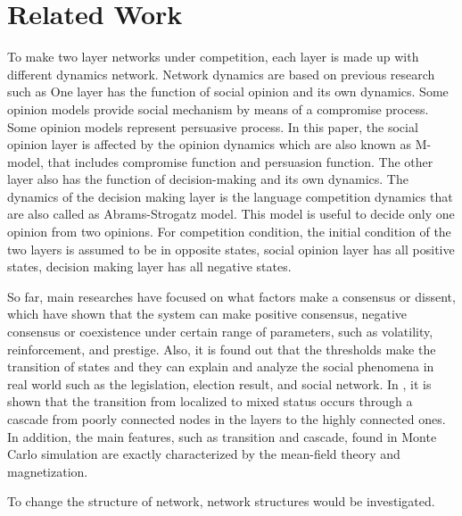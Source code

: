 \section{Related Work}
To make two layer networks under competition, each layer is made up with different dynamics network. Network dynamics are based on previous research such as \cite{alvarez2016} One layer has the function of social opinion and its own dynamics. Some opinion models provide social mechanism by means of a compromise process.\cite{naim2003} Some opinion models represent persuasive process.\cite{chau2014} In this paper, the social opinion layer is affected by the opinion dynamics which are also known as M-model\cite{rocca2014}, that includes compromise function and persuasion function. The other layer also has the function of decision-making and its own dynamics. The dynamics of the decision making layer is the language competition dynamics that are also called as Abrams-Strogatz model\cite{abrams2003, vazquez2010, patriarca2012}. This model is useful to decide only one opinion from two opinions. For competition condition, the initial condition of the two layers is assumed to be in opposite states, social opinion layer has all positive states, decision making layer has all negative states.

So far, main researches have focused on what factors make a consensus or dissent, which have shown that the system can make positive consensus, negative consensus or coexistence under certain range of parameters, such as volatility, reinforcement, and prestige. Also, it is found out that the thresholds make the transition of states and they can explain and analyze the social phenomena in real world such as the legislation, election result, and social network\cite{alvarez2016, amato2017, diep2017}. In \cite{gomez2015}, it is shown that the transition from localized to mixed status occurs through a cascade from poorly connected nodes in the layers to the highly connected ones. In addition, the main features, such as transition and cascade, found in Monte Carlo simulation are exactly characterized by the mean-field theory and magnetization\cite{alvarez2016, diep2017, amato2017, gomez2015}.

To change the structure of network, network structures would be investigated.   

